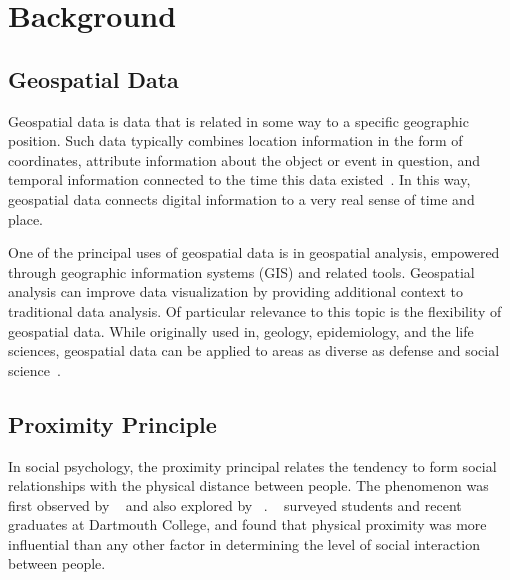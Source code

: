 \section{Background}

\subsection{Geospatial Data}

Geospatial data is data that is related in some way to a specific geographic position. Such data typically combines location information in the form of coordinates, attribute information about the object or event in question, and temporal information connected to the time this data existed~\cite{ibm}. In this way, geospatial data connects digital information to a very real sense of time and place.

One of the principal uses of geospatial data is in geospatial analysis, empowered through geographic information systems (\textsc{GIS}) and related tools. Geospatial analysis can improve data visualization by providing additional context to traditional data analysis. Of particular relevance to this topic is the flexibility of geospatial data. While originally used in, geology, epidemiology, and the life sciences, geospatial data can be applied to areas as diverse as defense and social science~\cite{ibm}.

\subsection{Proximity Principle}

In social psychology, the proximity principal relates the tendency to form social relationships with the physical distance between people. The phenomenon was first observed by \citeauthor{newcomb_1960}~\cite{newcomb_1960} and also explored by \citeauthor{festinger_1950}~\cite{festinger_1950}. \citeauthor{marmaros_2006}~\cite{marmaros_2006} surveyed students and recent graduates at Dartmouth College, and found that physical proximity was more influential than any other factor in determining the level of social interaction between people.
